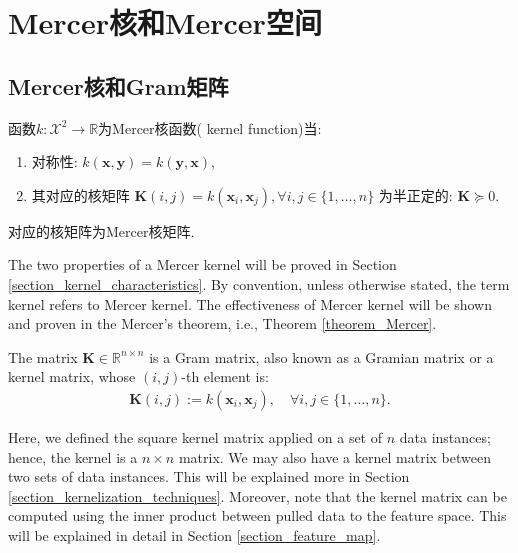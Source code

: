 \documentclass[lang=cn,10pt]{gorgeousnbook}
\numberwithin{equation}{section}%
\numberwithin{figure}{section}%
\begin{document}
\section{Mercer核和Mercer空间}\label{section_Mercer_kernel_and_spaces}

\subsection{Mercer核和Gram矩阵}

\begin{definition} \label{definition_Mercer_kernel}
函数$k: \mathcal{X}^2 \rightarrow \mathbb{R}$为Mercer核函数( kernel function)当:

\begin{enumerate}[topsep=0pt,itemsep=-1ex,partopsep=1ex,parsep=1ex]
\item 对称性: $k(\boldsymbol{x}, \boldsymbol{y}) = k(\boldsymbol{y}, \boldsymbol{x})$,
\item 其对应的核矩阵 $\boldsymbol{K}(i,j) = k(\boldsymbol{x}_i, \boldsymbol{x}_j), \forall i,j \in \{1, \dots, n\}$ 为半正定的: $\boldsymbol{K} \succeq 0$. 
\end{enumerate}
对应的核矩阵为Mercer核矩阵. 
\end{definition}

The two properties of a Mercer kernel will be proved in Section \ref{section_kernel_characteristics}.
By convention, unless otherwise stated, the term kernel refers to Mercer kernel. 
The effectiveness of Mercer kernel will be shown and proven in the Mercer's theorem, i.e., Theorem \ref{theorem_Mercer}.

\begin{definition}\label{definition_Gram_matrix}
The matrix $\boldsymbol{K} \in \mathbb{R}^{n \times n}$ is a Gram matrix, also known as a Gramian matrix or a kernel matrix, whose $(i,j)$-th element is:
\begin{align}\label{equation_Gram_matrix}
\boldsymbol{K}(i,j) := k(\boldsymbol{x}_i, \boldsymbol{x}_j), \quad \forall i,j \in \{1, \dots, n\}.
\end{align}
\end{definition}
Here, we defined the square kernel matrix applied on a set of $n$ data instances; hence, the kernel is a $n \times n$ matrix. We may also have a kernel matrix between two sets of data instances. This will be explained more in Section \ref{section_kernelization_techniques}. 
Moreover, note that the kernel matrix can be computed using the inner product between pulled data to the feature space. This will be explained in detail in Section \ref{section_feature_map}.
\end{document}
